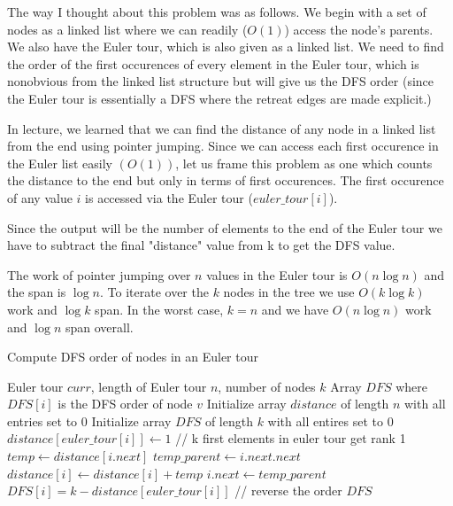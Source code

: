 \documentclass[11pt]{article}
\theoremstyle{definition}
\begin{document}
The way I thought about this problem was as follows. We begin with a set of nodes as a linked list where we can readily ($O(1)$) access the node's parents. We also have the Euler tour, which is also given as a linked list. We need to find the order of the first occurences of every element in the Euler tour, which is nonobvious from the linked list structure but will give us the DFS order (since the Euler tour is essentially a DFS where the retreat edges are made explicit.)

In lecture, we learned that we can find the distance of any node in a linked list from the end using pointer jumping. Since we can access each first occurence in the Euler list easily $(O(1))$, let us frame this problem as one which counts the distance to the end but only in terms of first occurences. The first occurence of any value $i$ is accessed via the Euler tour ($euler\_tour[i]$).

Since the output will be the number of elements to the end of the Euler tour we have to subtract the final "distance" value from k to get the DFS value.

The work of pointer jumping over $n$ values in the Euler tour is $O(n \log n)$ and the span is $\log n$. To iterate over the $k$ nodes in the tree we use $O(k \log k)$ work and $\log k$ span. In the worst case, $k = n$ and we have $O(n \log n)$ work and $\log n$ span overall. 

\begin{algorithm}[H]
\caption{Compute DFS order of nodes in an Euler tour}
\begin{algorithmic}[1]
\REQUIRE Euler tour $curr$, length of Euler tour $n$, number of nodes $k$
\ENSURE Array $DFS$ where $DFS[i]$ is the DFS order of node $v$
\STATE Initialize array $distance$ of length $n$ with all entries set to $0$
\STATE Initialize array $DFS$ of length $k$ with all entires set to $0$
    \STATE $distance[euler\_tour[i]] \gets 1$ \hfill // k first elements in euler tour get rank 1
\ENDFOR
{}
        \STATE $temp \gets distance[i.next]$
        \STATE $temp\_parent \gets i.next.next$
    \ENDFOR
        \STATE $distance[i] \gets distance[i] + temp$
        \STATE $i.next \gets temp\_parent$
    \ENDFOR
\ENDFOR
{}
    \STATE $DFS[i] = k - distance[euler\_tour[i]]$ \hfill // reverse the order
\ENDFOR
\RETURN $DFS$
\end{algorithmic}
\end{algorithm}
\end{document}
